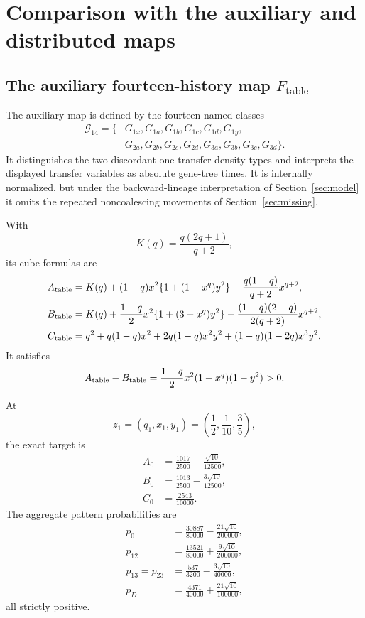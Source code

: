 \documentclass[11pt]{article}
\newcommand{\Table}{F_{\mathrm{table}}}
\begin{document}
\section{Comparison with the auxiliary and distributed maps}\label{sec:comparison}

\subsection{The auxiliary fourteen-history map \texorpdfstring{$\Table$}{Ftable}}
The auxiliary map is defined by the fourteen named classes
\[
\begin{aligned}
\mathcal G_{14}=\{&G_{1x},G_{1a},G_{1b},G_{1c},G_{1d},G_{1y},\\
                    &G_{2a},G_{2b},G_{2c},G_{2d},
                      G_{3a},G_{3b},G_{3c},G_{3d}\}.
\end{aligned}
\]
It distinguishes the two discordant one-transfer density types and interprets the displayed transfer variables as absolute gene-tree times.  It is internally normalized, but under the backward-lineage interpretation of Section~\ref{sec:model} it omits the repeated noncoalescing movements of Section~\ref{sec:missing}.

With
\[
K(q)=\frac{q(2q+1)}{q+2},
\]
its cube formulas are
\begin{align}
A_{\rm table}&=K(q)+(1-q)x^2\{1+(1-x^q)y^2\}
+\frac{q(1-q)}{q+2}x^{q+2},\label{eq:Atable}\\
B_{\rm table}&=K(q)+\frac{1-q}{2}x^2\{1+(3-x^q)y^2\}
-\frac{(1-q)(2-q)}{2(q+2)}x^{q+2},\label{eq:Btable}\\
C_{\rm table}&=q^2+q(1-q)x^2+2q(1-q)x^2y^2
+(1-q)(1-2q)x^3y^2.\label{eq:Ctable}
\end{align}
It satisfies
\[
A_{\rm table}-B_{\rm table}
=\frac{1-q}{2}x^2(1+x^q)(1-y^2)>0.
\]

At
\[
z_1=(q_1,x_1,y_1)=\left(\frac12,\frac1{10},\frac35\right),
\]
the exact target is
\begin{align*}
A_0&=\frac{1017}{2500}-\frac{\sqrt{10}}{12500},\\
B_0&=\frac{1013}{2500}-\frac{3\sqrt{10}}{12500},\\
C_0&=\frac{2543}{10000}.
\end{align*}
The aggregate pattern probabilities are
\begin{align*}
p_0&=\frac{30887}{80000}-\frac{21\sqrt{10}}{200000},\\
p_{12}&=\frac{13521}{80000}+\frac{9\sqrt{10}}{200000},\\
p_{13}=p_{23}&=\frac{537}{3200}-\frac{3\sqrt{10}}{40000},\\
p_D&=\frac{4371}{40000}+\frac{21\sqrt{10}}{100000},
\end{align*}
all strictly positive.
\end{document}

